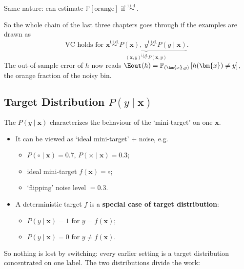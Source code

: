 \begin{moral}
    Same nature: can estimate \(\mathbb{P}[\text{orange}]\) if
    \(\overset{\text{i.i.d.}}{\sim}\).
\end{moral}

So the whole chain of the last three chapters goes through if the examples are
drawn as
\[
    \text{VC holds for }
    \underbrace{\bm{x} \overset{\text{i.i.d.}}{\sim} P(\bm{x}), \;
    y \overset{\text{i.i.d.}}{\sim} P(y \mid \bm{x})}_{(\bm{x}, y)
    \overset{\text{i.i.d.}}{\sim} P(\bm{x}, y)} .
\]
The out-of-sample error of \(h\) now reads \(\Eout(h) = \mathbb{P}_{(\bm{x},
y)}\left[ h(\bm{x}) \neq y \right]\), the orange fraction of the noisy bin.

\subsection{Target Distribution \texorpdfstring{\(P(y \mid \bm{x})\)}{P(y|x)}}

\begin{definition}\label{def:target-dist}
    The  \(P(y \mid \bm{x})\) characterizes the
    behaviour of the `mini-target' on one \(\bm{x}\).
\end{definition}

\begin{itemize}
    \item It can be viewed as `ideal mini-target' \(+\) noise, e.g.
    \begin{itemize}
        \item \(P(\circ \mid \bm{x}) = 0.7\), \(P(\times \mid \bm{x}) = 0.3\);
        \item ideal mini-target \(f(\bm{x}) = \circ\);
        \item `flipping' noise level \(= 0.3\).
    \end{itemize}
    \item A deterministic target \(f\) is a \textbf{special case of target
        distribution}:
    \begin{itemize}
        \item \(P(y \mid \bm{x}) = 1\) for \(y = f(\bm{x})\);
        \item \(P(y \mid \bm{x}) = 0\) for \(y \neq f(\bm{x})\).
    \end{itemize}
\end{itemize}

So nothing is lost by switching: every earlier setting is a target distribution
concentrated on one label. The two distributions divide the work:

